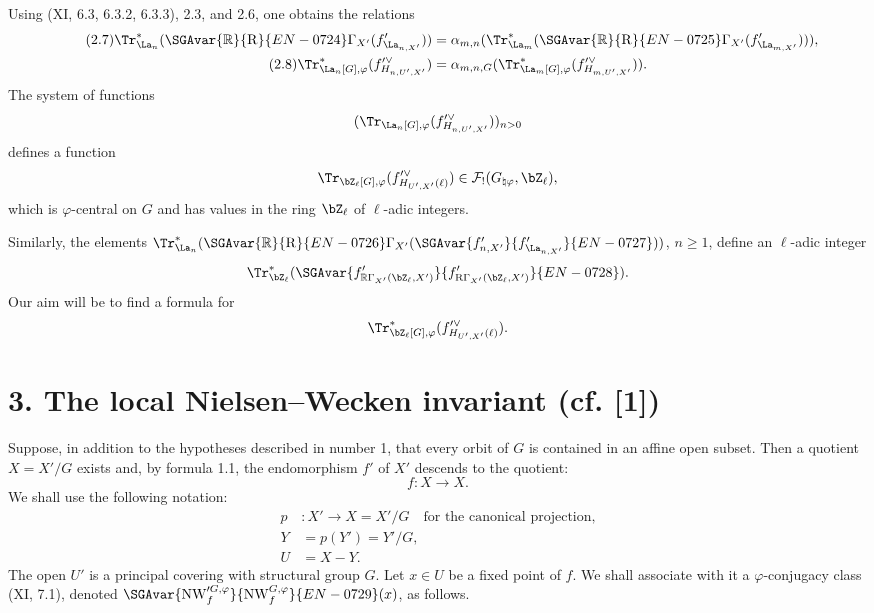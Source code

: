 Using (XI, 6.3, 6.3.2, 6.3.3), 2.3, and 2.6, one obtains the relations
\begin{align}
\tag{2.7}\Tr^*_{\La_n}(\SGAvar{\mathbb{R}}{\mathrm{R}}{EN-0724}\Gamma_{X'}(f'_{\La_{n,X'}}))&=\alpha_{m,n}(\Tr^*_{\La_m}(\SGAvar{\mathbb{R}}{\mathrm{R}}{EN-0725}\Gamma_{X'}(f'_{\La_{m,X'}}))),\\
\tag{2.8}\Tr^*_{\La_n[G],\varphi}(f'^\vee_{H_{n,U',X'}})&=\alpha_{m,n,G}(\Tr^*_{\La_m[G],\varphi}(f'^\vee_{H_{m,U',X'}})).
\end{align}
The system of functions
\[
(\Tr_{\La_n[G],\varphi}(f'^\vee_{H_{n,U',X'}}))_{n>0}
\]
defines a function
\[
\Tr_{\bZ_\ell[G],\varphi}(f'^\vee_{H_{U',X'}(\ell)})
\in \mathcal F_!(G_{\natural\varphi},\bZ_\ell),
\]
which is $\varphi$-central on $G$ and has values in the ring $\bZ_\ell$ of $\ell$-adic integers.

Similarly, the elements $\Tr^*_{\La_n}(\SGAvar{\mathbb{R}}{\mathrm{R}}{EN-0726}\Gamma_{X'}(\SGAvar{f'_{{n,X'}}}{f'_{\La_{n,X'}}}{EN-0727}))$, $n\ge1$, define an $\ell$-adic integer
\[
\Tr^*_{\bZ_\ell}(\SGAvar{f'_{\mathbb{R}\Gamma_{X'}(\bZ_\ell,X')}}{f'_{\mathrm{R}\Gamma_{X'}(\bZ_\ell,X')}}{EN-0728}).
\]
Our aim will be to find a formula for
\[
\Tr^*_{\bZ_\ell[G],\varphi}(f'^\vee_{H_{U',X'}(\ell)}).
\]

\section*{3. The local Nielsen--Wecken invariant (cf. [1])}
Suppose, in addition to the hypotheses described in number 1, that every orbit of $G$ is contained in an affine open subset. Then a quotient $X=X'/G$ exists and, by formula 1.1, the endomorphism $f'$ of $X'$ descends to the quotient:
\[
f:X\longrightarrow X .
\]
We shall use the following notation:
\begin{align*}
p &: X'\longrightarrow X=X'/G\quad \text{for the canonical projection,}\\
Y&=p(Y')=Y'/G,\\
U&=X-Y.
\end{align*}
The open $U'$ is a principal covering with structural group $G$. Let $x\in U$ be a fixed point of $f$. We shall associate with it a $\varphi$-conjugacy class (XI, 7.1), denoted $\SGAvar{\mathrm{NW}_{f}'^{G,\varphi}}{\mathrm{NW}_{f}^{G,\varphi}}{EN-0729}(x)$, as follows.


